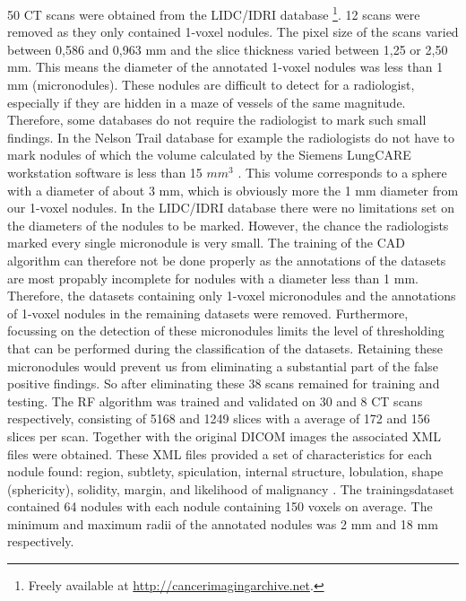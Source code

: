 50 CT scans were obtained from the LIDC/IDRI database \footnote{Freely available
at \url{http://cancerimagingarchive.net}.}. 12 scans were removed as they only
contained 1-voxel nodules. The pixel size of the scans varied between 0,586 and
0,963 mm and the slice thickness varied between 1,25 or 2,50 mm. This means the
diameter of the annotated 1-voxel nodules was less than 1 mm (micronodules).
These nodules are difficult to detect for a radiologist, especially if they are
hidden in a maze of vessels of the same magnitude. Therefore, some databases do
not require the radiologist to mark such small findings. In the Nelson Trail
database for example the radiologists do not have to mark nodules of which the
volume calculated by the Siemens LungCARE workstation software is less than 15
$mm^3$ \cite{mur}. This volume corresponds to a sphere with a diameter of about
3 mm, which is obviously more the 1 mm diameter from our 1-voxel nodules.
In the LIDC/IDRI database there were no limitations set on the diameters of the
nodules to be marked. However, the chance the radiologists marked every single
micronodule is very small. The training of the CAD algorithm can therefore not
be done properly as the annotations of the datasets are most propably incomplete
for nodules with a diameter less than 1 mm. Therefore, the datasets containing
only 1-voxel micronodules and the annotations of 1-voxel nodules in the
remaining datasets were removed. Furthermore, focussing on the detection of
these micronodules limits the level of thresholding that can be performed during
the classification of the datasets. Retaining these micronodules would prevent
us from eliminating a substantial part of the false positive findings. So
after eliminating these 38 scans remained for training and testing.
The RF algorithm was trained and validated on 30 and 8 CT scans respectively,
consisting of 5168 and 1249 slices with a average of 172 and 156 slices per
scan. Together with the original DICOM images the associated XML files
were obtained. These XML files provided a set of characteristics for each nodule
found: region, subtlety, spiculation, internal structure, lobulation, shape
(sphericity), solidity, margin, and likelihood of malignancy \cite{lidcbase}.
The trainingsdataset contained 64 nodules with each nodule containing 150 voxels
on average. The minimum and maximum radii of the annotated nodules was 2 mm and
18 mm respectively.


